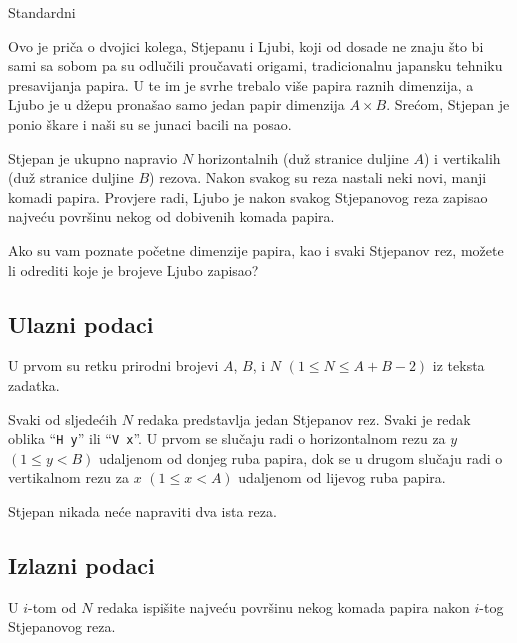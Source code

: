 \begin{statement}[
  problempoints=100,
  timelimit=1 sekunda,
  memorylimit=512 MiB,
]{Standardni}

Ovo je priča o dvojici kolega, Stjepanu i Ljubi, koji od dosade ne znaju što bi
sami sa sobom pa su odlučili proučavati origami, tradicionalnu japansku
tehniku presavijanja papira. U te im je svrhe trebalo više papira raznih
dimenzija, a Ljubo je u džepu pronašao samo jedan papir dimenzija $A\times B$.
Srećom, Stjepan je ponio škare i naši su se junaci bacili na posao.

Stjepan je ukupno napravio $N$ horizontalnih (duž stranice duljine $A$) i
vertikalih (duž stranice duljine $B$) rezova. Nakon svakog su reza nastali
neki novi, manji komadi papira.  Provjere radi, Ljubo je nakon svakog
Stjepanovog reza zapisao najveću površinu nekog od dobivenih komada papira.

Ako su vam poznate početne dimenzije papira, kao i svaki Stjepanov rez, možete
li odrediti koje je brojeve Ljubo zapisao?

\subsection*{Ulazni podaci}
U prvom su retku prirodni brojevi $A$, $B$, i $N$ $(1 \le N \le A + B - 2)$ iz
teksta zadatka.

Svaki od sljedećih $N$ redaka predstavlja jedan Stjepanov rez. Svaki je redak
oblika ``\texttt{H y}'' ili ``\texttt{V x}''. U prvom se slučaju radi o
horizontalnom rezu za $y$ $(1 \le y < B)$ udaljenom od donjeg ruba papira, dok
se u drugom slučaju radi o vertikalnom rezu za $x$ $(1 \le x < A)$ udaljenom
od lijevog ruba papira.

Stjepan nikada neće napraviti dva ista reza.

\subsection*{Izlazni podaci}
U $i$-tom od $N$ redaka ispišite najveću površinu nekog komada papira nakon
$i$-tog Stjepanovog reza.


\end{statement}

